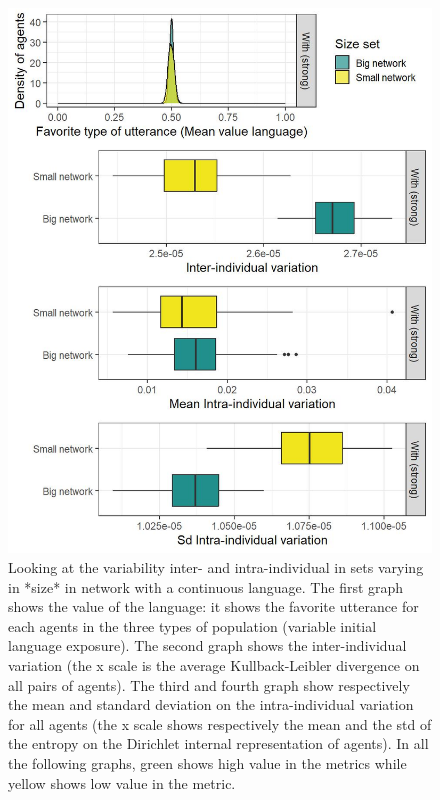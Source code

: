 \documentclass[
]{article}
\begin{document}
\begin{figure}[!H]

{\centering \includegraphics{./Figures/unnamed-chunk-52-1} 

}

\caption{Looking at the variability inter- and intra-individual in sets varying in *size* in network with a continuous language. The first graph shows the value of the language: it shows the favorite utterance for each agents in the three types of population (variable initial language exposure). The second graph shows the  inter-individual variation (the x scale is the average Kullback-Leibler divergence on all pairs of agents). The third and fourth graph show respectively the mean and standard deviation on the intra-individual variation for all agents (the x scale shows respectively the mean and the std of the entropy on the Dirichlet internal representation of agents). In all the following graphs, green shows high value in the metrics while yellow shows low value in the metric.}\label{fig:unnamed-chunk-52}
\end{figure}
\end{document}
